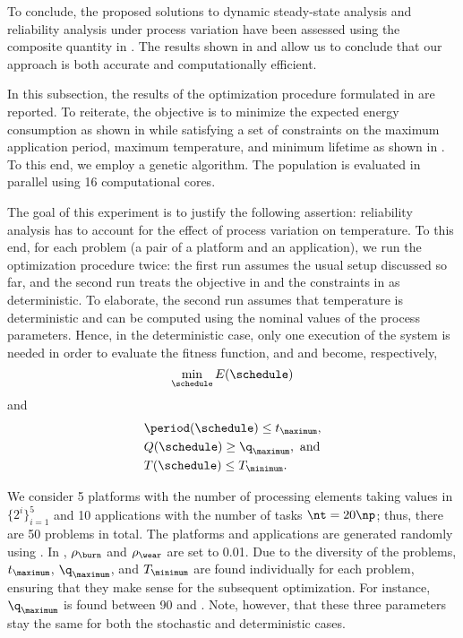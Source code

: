 To conclude, the proposed solutions to dynamic steady-state analysis and
reliability analysis under process variation have been assessed using the
composite quantity in . The results shown in
 and  allow us
to conclude that our approach is both accurate and computationally efficient.


In this subsection, the results of the optimization procedure formulated in
 are reported. To reiterate, the objective
is to minimize the expected energy consumption as shown in
 while satisfying a set of constraints on the
maximum application period, maximum temperature, and minimum lifetime as shown
in . To this end, we employ a genetic
algorithm. The population is evaluated in parallel using 16 computational cores.

The goal of this experiment is to justify the following assertion: reliability
analysis has to account for the effect of process variation on temperature. To
this end, for each problem (a pair of a platform and an application), we run the
optimization procedure twice: the first run assumes the usual setup discussed so
far, and the second run treats the objective in
 and the constraints in
 as deterministic. To elaborate, the second
run assumes that temperature is deterministic and can be computed using the
nominal values of the process parameters. Hence, in the deterministic case, only
one execution of the system is needed in order to evaluate the fitness function,
and  and 
become, respectively,
\[
    \min_{\schedule} E(\schedule)
\]
and
\[
  \begin{split}
    & \period(\schedule) \leq t_\maximum, \\
    & Q(\schedule) \geq \q_\maximum, \text{ and} \\
    & T(\schedule) \leq T_\minimum.
  \end{split}
\]

We consider 5 platforms with the number of processing elements \np taking values
in $\{ 2^i \}_{i = 1}^5$ and 10 applications with the number of tasks $\nt = 20
\np$; thus, there are 50 problems in total. The platforms and applications are
generated randomly using  \cite{dick1998}. In
, $\rho_\burn$ and $\rho_\wear$ are set to
0.01. Due to the diversity of the problems, $t_\maximum$, $\q_\maximum$, and
$T_\minimum$ are found individually for each problem, ensuring that they make
sense for the subsequent optimization. For instance, $\q_\maximum$ is found
between 90 and . Note, however, that these three parameters stay
the same for both the stochastic and deterministic cases.


